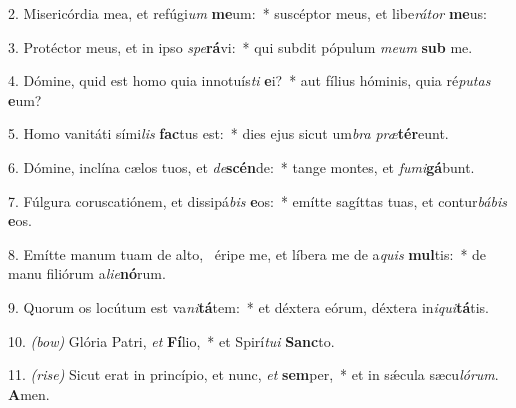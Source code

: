 2. Misericórdia mea, et refúgi\textit{um} \textbf{me}um:~* suscéptor meus, et libe\textit{rá}\textit{tor} \textbf{me}us:

3. Protéctor meus, et in ipso \textit{spe}\textbf{rá}vi:~* qui subdit pópulum \textit{me}\textit{um} \textbf{sub} me.

4. Dómine, quid est homo quia innotuís\textit{ti} \textbf{e}i?~* aut fílius hóminis, quia ré\textit{pu}\textit{tas} \textbf{e}um?

5. Homo vanitáti sími\textit{lis} \textbf{fac}tus est:~* dies ejus sicut um\textit{bra} \textit{præ}\textbf{tér}eunt.

6. Dómine, inclína cælos tuos, et \textit{de}\textbf{scén}de:~* tange montes, et \textit{fu}\textit{mi}\textbf{gá}bunt.

7. Fúlgura coruscatiónem, et dissipá\textit{bis} \textbf{e}os:~* emítte sagíttas tuas, et contur\textit{bá}\textit{bis} \textbf{e}os.

8. Emítte manum tuam de alto,~{\color{red}\GreDagger} éripe me, et líbera me de a\textit{quis} \textbf{mul}tis:~* de manu filiórum a\textit{li}\textit{e}\textbf{nó}rum.

9. Quorum os locútum est va\textit{ni}\textbf{tá}tem:~* et déxtera eórum, déxtera in\textit{i}\textit{qui}\textbf{tá}tis.

10. {\color{red}\textit{(bow)}} Glória Patri, \textit{et} \textbf{Fí}lio,~* et Spirí\textit{tu}\textit{i} \textbf{Sanc}to.

11. {\color{red}\textit{(rise)}} Sicut erat in princípio, et nunc, \textit{et} \textbf{sem}per,~* et in s\'{\ae}cula sæcu\textit{ló}\textit{rum}. \textbf{A}men.


